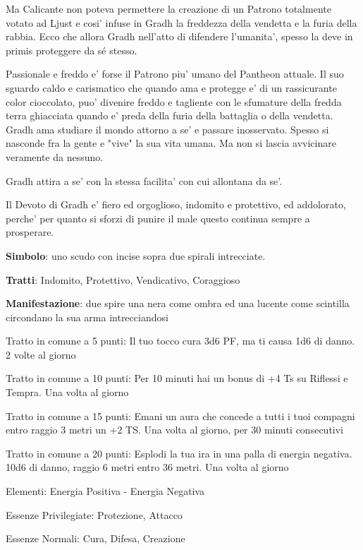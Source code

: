\documentclass[a4paper,11pt,twoside,openany]{book}
\begin{document}
{Ma Calicante non poteva permettere la creazione di un Patrono totalmente votato ad Ljust e cosi' infuse in Gradh la freddezza della vendetta e la furia della rabbia. Ecco che allora Gradh nell'atto di difendere l'umanita', spesso la deve in primis proteggere da sé stesso.

Passionale e freddo e' forse il Patrono piu' umano del Pantheon attuale. Il suo sguardo caldo e carismatico che quando ama e protegge e' di un rassicurante color cioccolato, puo' divenire freddo e tagliente con le sfumature della fredda terra ghiacciata quando e' preda della furia della battaglia o della vendetta. Gradh ama studiare il mondo attorno a se' e passare inosservato. Spesso si nasconde fra la gente e "vive" la sua vita umana. Ma non si lascia avvicinare veramente da nessuno.

Gradh attira a se' con la stessa facilita' con cui allontana da se'.

Il Devoto di Gradh e' fiero ed orgoglioso, indomito e protettivo, ed addolorato, perche' per quanto si sforzi di punire il male questo continua sempre a prosperare.

\textbf{Simbolo}: uno scudo con incise sopra due spirali intrecciate.

\textbf{Tratti}: Indomito, Protettivo, Vendicativo, Coraggioso

\textbf{Manifestazione}: due spire una nera come ombra ed una lucente come scintilla circondano la sua arma intrecciandosi

\bigskip

Tratto in comune a 5 punti: Il tuo tocco cura 3d6 PF, ma ti causa 1d6 di danno. 2 volte al giorno

Tratto in comune a 10 punti: Per 10 minuti hai un bonus di +4 Ts su Riflessi e Tempra. Una volta al giorno

Tratto in comune a 15 punti: Emani un aura che concede a tutti i tuoi compagni entro raggio 3 metri un +2 TS. Una volta al giorno, per 30 minuti consecutivi

Tratto in comune a 20 punti: Esplodi la tua ira in una palla di energia negativa. 10d6 di danno, raggio 6 metri entro 36 metri. Una volta al giorno

\bigskip

Elementi: Energia Positiva - Energia Negativa

\bigskip

Essenze Privilegiate: Protezione, Attacco

Essenze Normali: Cura, Difesa, Creazione

}
\end{document}
